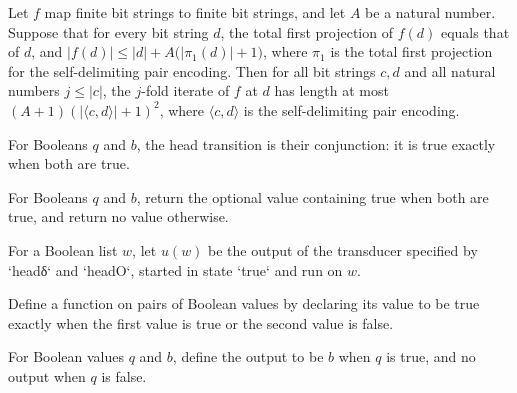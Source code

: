 \begin{theorem}
\label{Complexity.BinArith.forLoop_bound_of_ctx}
\leanok
{}
Let $f$ map finite bit strings to finite bit strings, and let $A$ be a natural number.
Suppose that for every bit string $d$, the total first projection of $f(d)$ equals that
of $d$, and $|f(d)|\le |d|+A\bigl(|\pi_1(d)|+1\bigr)$, where $\pi_1$ is the total first
projection for the self-delimiting pair encoding. Then for all bit strings $c,d$ and all
natural numbers $j\le |c|$, the $j$-fold iterate of $f$ at $d$ has length at most
$(A+1)(|\langle c,d\rangle|+1)^2$, where $\langle c,d\rangle$ is the self-delimiting
pair encoding.
\end{theorem}

\begin{definition}
\leanok
For Booleans $q$ and $b$, the head transition is their conjunction: it is true exactly
when both are true.
\end{definition}

\begin{definition}
\label{Complexity.BinArith.headO}
\leanok
For Booleans $q$ and $b$, return the optional value containing true when both are true,
and return no value otherwise.
\end{definition}

\begin{definition}
\label{Complexity.BinArith.uHead}
\leanok
{}
For a Boolean list $w$, let $u(w)$ be the output of the transducer specified by `headδ`
and `headO`, started in state `true` and run on $w$.
\end{definition}

\begin{definition}
\leanok
Define a function on pairs of Boolean values by declaring its value to be true exactly
when the first value is true or the second value is false.
\end{definition}

\begin{definition}
\label{Complexity.BinArith.restO}
\leanok
For Boolean values $q$ and $b$, define the output to be $b$ when $q$ is true, and no
output when $q$ is false.
\end{definition}

